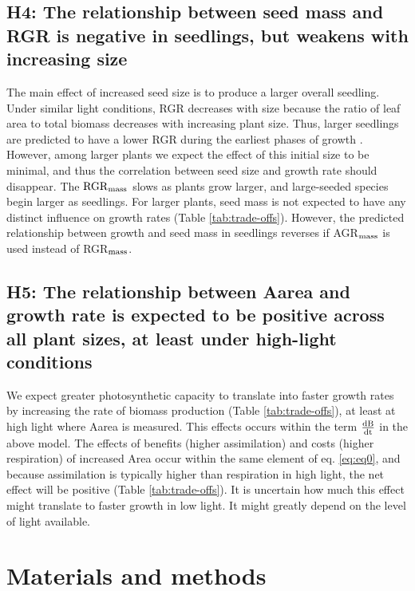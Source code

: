 \documentclass[a4paper,11pt]{article}
\newcommand{\ud}{\ensuremath{\rm{d}}}
\begin{document}
\subsection*{H4: The relationship between seed mass and RGR is negative in seedlings, but weakens with increasing size}

The main effect of increased seed size is to produce a larger overall seedling. Under similar light conditions, RGR decreases with size because the ratio of leaf area to total biomass decreases with increasing plant size. Thus, larger seedlings are predicted to have a lower RGR during the earliest phases of growth \citep{Turnbull:2012ew}. However, among larger plants we expect the effect of this initial size to be minimal, and thus the correlation between seed size and growth rate should disappear. The ${\rm RGR}_{{\rm mass}}$ slows as plants grow larger, and large-seeded species begin larger as seedlings. For larger plants, seed mass is not expected to have any distinct influence on growth rates  (Table \ref{tab:trade-offs}). However, the predicted relationship between growth and seed mass in seedlings reverses if AGR$_{\rm mass}$ is used instead of RGR$_{\rm mass}$.

\subsection*{H5: The relationship between Aarea and growth rate is expected to be positive across all plant sizes, at least under high-light conditions}

We expect greater photosynthetic capacity to translate into faster growth rates by increasing the rate of biomass production (Table \ref{tab:trade-offs}), at least at high light where Aarea is measured. This effects occurs within the term  $\frac{\ud B}{\ud t} $ in the above model. The effects of benefits (higher assimilation) and costs (higher respiration) of increased Area occur within the same element of eq. \ref{eq:eq0}, and because assimilation is typically higher than respiration in high light, the net effect will be positive (Table \ref{tab:trade-offs}). It is uncertain how much this effect might translate to faster growth in low light. It might greatly depend on the level of light available.

\section*{Materials and methods}\label{material-and-methods}
\end{document}
